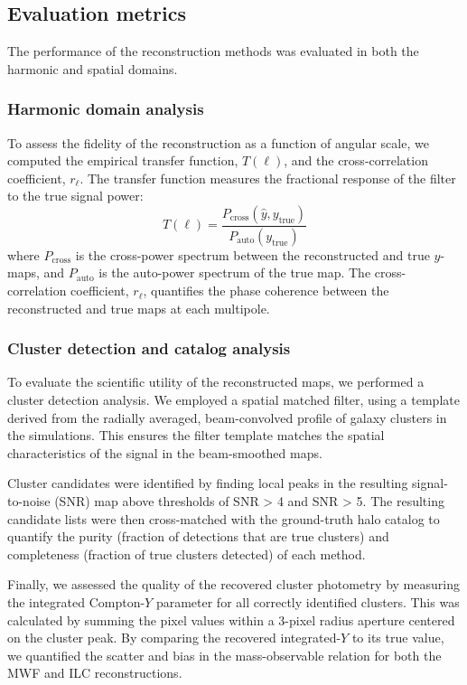\documentclass[]{article}
\begin{document}
\subsection{Evaluation metrics}
The performance of the reconstruction methods was evaluated in both the harmonic and spatial domains.

\subsubsection{Harmonic domain analysis}
To assess the fidelity of the reconstruction as a function of angular scale, we computed the empirical transfer function, $T(\ell)$, and the cross-correlation coefficient, $r_\ell$. The transfer function measures the fractional response of the filter to the true signal power:
\begin{equation}
    T(\ell) = \frac{P_{\text{cross}}(\hat{y}, y_{\text{true}})}{P_{\text{auto}}(y_{\text{true}})}
\end{equation}
where $P_{\text{cross}}$ is the cross-power spectrum between the reconstructed and true $y$-maps, and $P_{\text{auto}}$ is the auto-power spectrum of the true map. The cross-correlation coefficient, $r_\ell$, quantifies the phase coherence between the reconstructed and true maps at each multipole.

\subsubsection{Cluster detection and catalog analysis}
To evaluate the scientific utility of the reconstructed maps, we performed a cluster detection analysis. We employed a spatial matched filter, using a template derived from the radially averaged, beam-convolved profile of galaxy clusters in the simulations. This ensures the filter template matches the spatial characteristics of the signal in the beam-smoothed maps.

Cluster candidates were identified by finding local peaks in the resulting signal-to-noise (SNR) map above thresholds of SNR > 4 and SNR > 5. The resulting candidate lists were then cross-matched with the ground-truth halo catalog to quantify the purity (fraction of detections that are true clusters) and completeness (fraction of true clusters detected) of each method.

Finally, we assessed the quality of the recovered cluster photometry by measuring the integrated Compton-$Y$ parameter for all correctly identified clusters. This was calculated by summing the pixel values within a 3-pixel radius aperture centered on the cluster peak. By comparing the recovered integrated-$Y$ to its true value, we quantified the scatter and bias in the mass-observable relation for both the MWF and ILC reconstructions.
\end{document}
